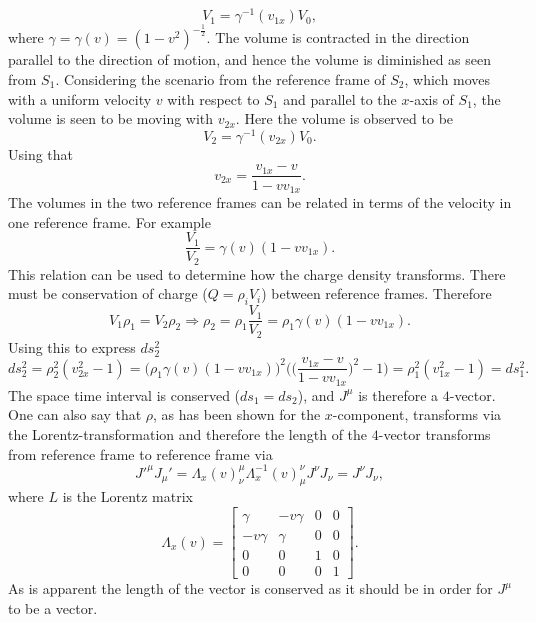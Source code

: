 \begin{example}
\begin{equation}
		V_1=\gamma^{-1}(v_{1x})V_0,
	\end{equation} 
	where $\gamma=\gamma(v)=(1-v^2)^{-\frac{1}{2}}$. The volume is contracted in the direction parallel to the direction of motion, and hence the volume is diminished as seen from $S_1$. Considering the scenario from the reference frame of $S_2$, which moves with a uniform velocity $v$ with respect to $S_1$ and parallel to the $x$-axis of $S_1$, the volume is seen to be moving with $v_{2x}$. Here the volume is observed to be
	\begin{equation}
		V_2=\gamma^{-1}(v_{2x})V_0.
	\end{equation} 
	Using that
	\begin{equation}
		v_{2x}=\frac{v_{1x}-v}{1-vv_{1x}}.
	\end{equation} 
	The volumes in the two reference frames can be related in terms of the velocity in one reference frame. For example
	\begin{equation}
		\frac{V_1}{V_2}=\gamma(v)(1-vv_{1x}).
	\end{equation} 
	This relation can be used to determine how the charge density transforms. There must be conservation of charge ($Q=\rho_iV_i$) between reference frames. Therefore
	\begin{equation}
		V_1\rho_1=V_2\rho_2\Rightarrow \rho_2=\rho_1\frac{V_1}{V_2}=\rho_1\gamma(v)(1-vv_{1x}).
	\end{equation} 
	Using this to express $ds_2^2$
	\begin{equation}
		ds_2^2=\rho_2^2(v_{2x}^2-1)=\bigg(\rho_1\gamma(v)(1-vv_{1x})\bigg)^2\bigg(\bigg(\frac{v_{1x}-v}{1-vv_{1x}}\bigg)^2-1\bigg)=\rho_1^2(v_{1x}^2-1)=ds_1^2.
	\end{equation} 
	The space time interval is conserved ($ds_1=ds_2$), and $J^\mu$ is therefore a $4$-vector. One can also say that $\rho$, as has been shown for the $x$-component, transforms via the Lorentz-transformation and therefore the length of the $4$-vector transforms from reference frame to reference frame via
	\begin{equation}
		J'^\mu J_\mu'={\Lambda_x}(v)^\mu_\nu {\Lambda^{-1}_x}(v)^\nu_\mu J^\nu J_\nu=J^\nu J_\nu,
	\end{equation} 
	where $L$ is the Lorentz matrix
	\begin{equation}
		\Lambda_x(v)=\begin{bmatrix}
			\gamma & -v\gamma & 0 & 0\\
			-v \gamma & \gamma & 0 & 0\\
			0 & 0 & 1 & 0\\
			0 & 0 & 0 & 1
		\end{bmatrix}.
	\end{equation} 
	As is apparent the length of the vector is conserved as it should be in order for $J^{\mu}$ to be a vector.
\end{example}



